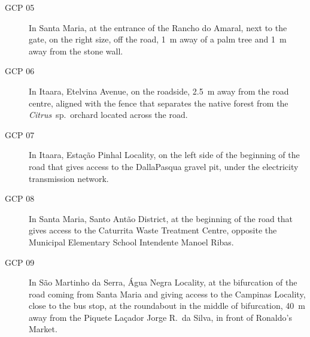 \begin{description}
\item[GCP 05]
In Santa Maria, at the entrance of the Rancho do Amaral, next to the gate, on the right size, off the road, 
\SI{1}{\m} away of a palm tree and \SI{1}{\m} away from the stone wall.
 
\item[GCP 06]
In Itaara, Etelvina Avenue, on the roadside, \SI{2.5}{\m} away from the road centre, aligned with the fence 
that separates the native forest from the \textit{Citrus}~sp.~orchard located across the road.

\item[GCP 07]
In Itaara, Estação Pinhal Locality, on the left side of the beginning of the road that gives access to the 
DallaPasqua gravel pit, under the electricity transmission network.

\item[GCP 08]
In Santa Maria, Santo Antão District, at the beginning of the road that gives access to the Caturrita Waste 
Treatment Centre, opposite the Municipal Elementary School Intendente Manoel Ribas.
 
\item[GCP 09]
In São Martinho da Serra, Água Negra Locality, at the bifurcation of the road coming from Santa Maria and 
giving access to the Campinas Locality, close to the bus stop, at the roundabout in the middle of bifurcation, 
\SI{40}{\m} away from the Piquete Laçador Jorge R.~da Silva, in front of Ronaldo's Market.


\end{description}

